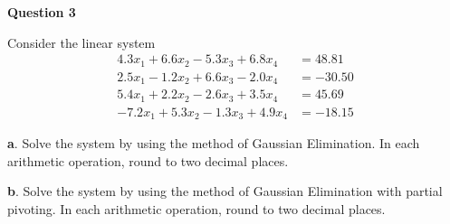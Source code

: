 

\begin{tcolorbox}
\textbf{Question 3} 

Consider the linear system
$$
\begin{aligned}
4.3 x_{1}+6.6 x_{2}-5.3 x_{3}+6.8 x_{4} &=48.81 \\
2.5 x_{1}-1.2 x_{2}+6.6 x_{3}-2.0 x_{4} &=-30.50 \\
5.4 x_{1}+2.2 x_{2}-2.6 x_{3}+3.5 x_{4} &=45.69 \\
-7.2 x_{1}+5.3 x_{2}-1.3 x_{3}+4.9 x_{4} &=-18.15
\end{aligned}
$$


\textbf a. Solve the system by using the method of Gaussian Elimination. In each arithmetic operation, round to two decimal places.



\textbf b. Solve the system by using the method of Gaussian Elimination with partial pivoting. In each arithmetic operation, round to two decimal places.






\end{tcolorbox}

\begin{solution}\ \\











\end{solution}
